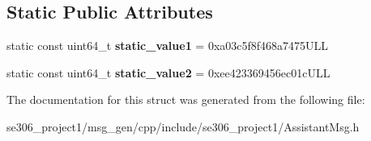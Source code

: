 \subsection*{Static Public Attributes}
\begin{DoxyCompactItemize}
\item 
\hypertarget{structros_1_1message__traits_1_1MD5Sum_3_01_1_1se306__project1_1_1AssistantMsg___3_01ContainerAllocator_01_4_01_4_a2fe2af80ffa1a7473555eecfa65f5bdb}{static const uint64\-\_\-t {\bfseries static\-\_\-value1} = 0xa03c5f8f468a7475\-U\-L\-L}\label{structros_1_1message__traits_1_1MD5Sum_3_01_1_1se306__project1_1_1AssistantMsg___3_01ContainerAllocator_01_4_01_4_a2fe2af80ffa1a7473555eecfa65f5bdb}

\item 
\hypertarget{structros_1_1message__traits_1_1MD5Sum_3_01_1_1se306__project1_1_1AssistantMsg___3_01ContainerAllocator_01_4_01_4_ae6d40a1d0327b6d042044884fb350544}{static const uint64\-\_\-t {\bfseries static\-\_\-value2} = 0xee423369456ec01c\-U\-L\-L}\label{structros_1_1message__traits_1_1MD5Sum_3_01_1_1se306__project1_1_1AssistantMsg___3_01ContainerAllocator_01_4_01_4_ae6d40a1d0327b6d042044884fb350544}

\end{DoxyCompactItemize}


The documentation for this struct was generated from the following file\-:\begin{DoxyCompactItemize}
\item 
se306\-\_\-project1/msg\-\_\-gen/cpp/include/se306\-\_\-project1/Assistant\-Msg.\-h\end{DoxyCompactItemize}
